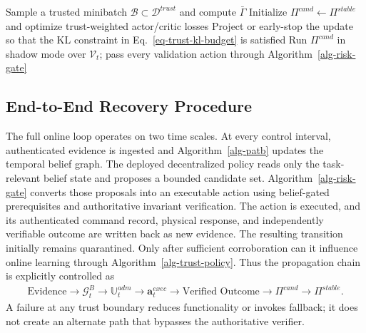 \begin{algorithm}[t]
\caption{Trust-Gated Online Recovery Policy Adaptation}
\label{alg-trust-policy}
Sample a trusted minibatch $\mathcal{B}\subset\mathcal{D}^{trust}$ and compute $\bar\Gamma$\;
Initialize $\Pi^{cand}\leftarrow\Pi^{stable}$ and optimize trust-weighted actor/critic losses\;
Project or early-stop the update so that the KL constraint in Eq.~\ref{eq-trust-kl-budget} is satisfied\;
Run $\Pi^{cand}$ in shadow mode over $\mathcal{V}_t$; pass every validation action through Algorithm~\ref{alg-risk-gate}\;
\;
\end{algorithm}

\subsection{End-to-End Recovery Procedure}
The full online loop operates on two time scales. At every control interval, authenticated evidence is ingested and Algorithm~\ref{alg-patb} updates the temporal belief graph. The deployed decentralized policy reads only the task-relevant belief state and proposes a bounded candidate set. Algorithm~\ref{alg-risk-gate} converts those proposals into an executable action using belief-gated prerequisites and authoritative invariant verification. The action is executed, and its authenticated command record, physical response, and independently verifiable outcome are written back as new evidence. The resulting transition initially remains quarantined. Only after sufficient corroboration can it influence online learning through Algorithm~\ref{alg-trust-policy}. Thus the propagation chain is explicitly controlled as
\begin{align}
\label{eq-end-to-end-chain}
\text{Evidence}
\rightarrow
\mathcal{G}_t^{B}
\rightarrow
\mathbb{U}_t^{adm}
\rightarrow
\mathbf{a}_t^{exec}
\rightarrow
\text{Verified Outcome}
\rightarrow
\Pi^{cand}
\rightarrow
\Pi^{stable}.
\end{align}
A failure at any trust boundary reduces functionality or invokes fallback; it does not create an alternate path that bypasses the authoritative verifier.

